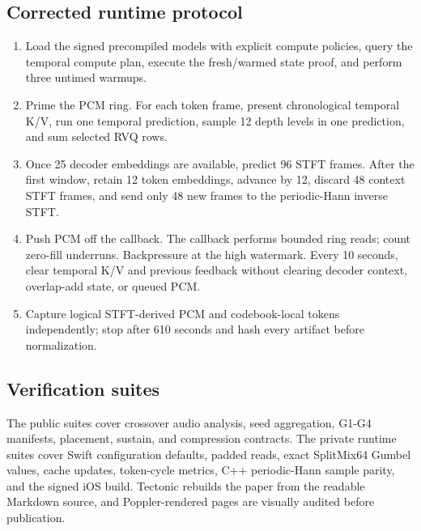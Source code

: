 \documentclass[10pt]{article}
\begin{document}
\subsection{Corrected runtime protocol}
\begin{enumerate}
\item Load the signed precompiled models with explicit compute policies, query the temporal compute plan, execute the fresh/warmed state proof, and perform three untimed warmups.
\item Prime the PCM ring. For each token frame, present chronological temporal K/V, run one temporal prediction, sample 12 depth levels in one prediction, and sum selected RVQ rows.
\item Once 25 decoder embeddings are available, predict 96 STFT frames. After the first window, retain 12 token embeddings, advance by 12, discard 48 context STFT frames, and send only 48 new frames to the periodic-Hann inverse STFT.
\item Push PCM off the callback. The callback performs bounded ring reads; count zero-fill underruns. Backpressure at the high watermark. Every 10 seconds, clear temporal K/V and previous feedback without clearing decoder context, overlap-add state, or queued PCM.
\item Capture logical STFT-derived PCM and codebook-local tokens independently; stop after 610 seconds and hash every artifact before normalization.
\end{enumerate}
\subsection{Verification suites}
The public suites cover crossover audio analysis, seed aggregation, G1-G4 manifests, placement, sustain, and compression contracts. The private runtime suites cover Swift configuration defaults, padded \texttt{} reads, exact SplitMix64 Gumbel values, cache updates, token-cycle metrics, C++ periodic-Hann sample parity, and the signed iOS build. Tectonic rebuilds the paper from the readable Markdown source, and Poppler-rendered pages are visually audited before publication.



\end{document}
